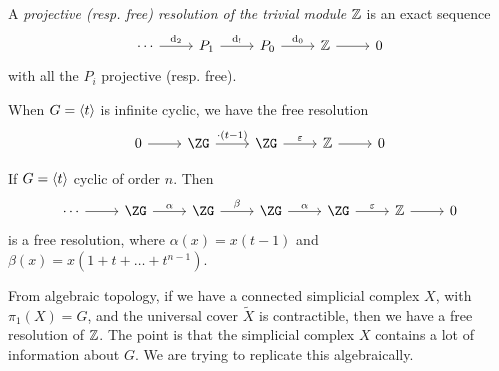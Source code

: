 \documentclass{article}
\begin{document}
\begin{definition}
    A \emph{projective (resp. free) resolution of the trivial module \(\mathbb{Z}\)} is an exact sequence
    \[\begin{tikzcd}
        \cdots & {P_1} & {P_0} & \Z & 0
        \arrow["{\dd_2}", from=1-1, to=1-2]
        \arrow["{\dd_!}", from=1-2, to=1-3]
        \arrow["{\dd_0}", from=1-3, to=1-4]
        \arrow[from=1-4, to=1-5]
    \end{tikzcd}\]
    with all the \(P_i\) projective (resp. free).
\end{definition}

\begin{example}
    When \(G = \left\langle t \right\rangle\) is infinite cyclic, we have the free resolution
\[\begin{tikzcd}
	0 & \ZG & \ZG & \Z & 0
	\arrow[from=1-1, to=1-2]
	\arrow["{\cdot(t-1)}", from=1-2, to=1-3]
	\arrow["\epsilon", from=1-3, to=1-4]
	\arrow[from=1-4, to=1-5]
\end{tikzcd}\]
\end{example}

\begin{example}
    If \(G = \left\langle t \right\rangle\) cyclic of order \(n\). Then
\[\begin{tikzcd}
	\cdots & \ZG & \ZG & \ZG & \ZG & \Z & 0
	\arrow["\epsilon", from=1-5, to=1-6]
	\arrow[from=1-6, to=1-7]
	\arrow["\alpha", from=1-4, to=1-5]
	\arrow["\beta", from=1-3, to=1-4]
	\arrow["\alpha", from=1-2, to=1-3]
	\arrow[from=1-1, to=1-2]
\end{tikzcd}\]
    is a free resolution, where \(\alpha(x) = x(t-1)\) and \(\beta(x) = x(1 + t + \dots + t^{n-1})\).
\end{example}

From algebraic topology, if we have a connected simplicial complex \(X\), with \(\pi_1(X) = G\), and the universal cover \(\widetilde X\) is contractible, then we have a free resolution of \(\mathbb{Z}\). The point is that the simplicial complex \(X\) contains a lot of information about \(G\). We are trying to replicate this algebraically.
\end{document}
